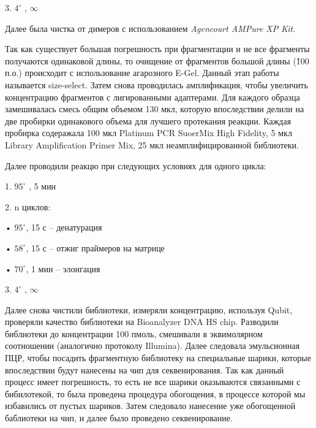 3.  $4^{\circ}$ ,  $\infty$

Далее была чистка от димеров с использованием \textit{Agencourt AMPure XP Kit}.

Так как существует большая погрешность при фрагментации и не все фрагменты получаются одинаковой длины, то очищение от фрагментов большой длины (\~100 п.о.) происходит с использование агарозного E-Gel. Данный этап работы называется size-select. Затем снова проводилась амплификация, чтобы увеличить концентрацию фрагментов с лигированными адаптерами. Для каждого образца замешивалась смесь общим объемом 130 мкл, которую впоследствии делили на две пробирки одинакового объема для лучшего протекания реакции. Каждая пробирка содеражала 100 мкл Platinum PCR SuoerMix High Fidelity, 5 мкл Library Amplification Primer Mix, 25 мкл неамплифицированной библиотеки. 

Далее проводили реакцю при следующих условиях для одного цикла:

1.	$95^{\circ}$ , 5 мин 

2.	n циклов:

•	$95^{\circ}$, 15 с – денатурация

•	$58^{\circ}$, 15 с – отжиг праймеров на матрице

•	$70^{\circ}$, 1 мин – элонгация

3.  $4^{\circ}$ ,  $\infty$

Далее снова чистили библиотеки, измеряли концентрацию, используя Qubit, проверяли качество библиотеки на Bioanalyzer DNA HS chip. Разводили библиотеки до концентрации 100 пмоль, смешивали в эквимолярном соотношении (аналогично протоколу Illumina). Далее следовала эмульсионная ПЦР, чтобы посадить фрагментную библиотеку на специальные шарики, которые впоследствии будут нанесены на чип для секвенирования. Так как данный процесс имеет погрешность, то есть не все шарики оказываются связанными с бибилотекой, то была проведена процедура обогощения, в процессе которой мы избавились от пустых шариков. Затем следовало нанесение уже обогощенной баблиотеки на чип, и далее было проведено секвенирование. 

\clearpage
